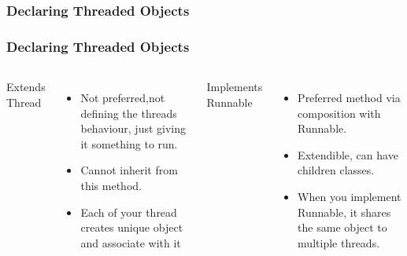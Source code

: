 \documentclass{beamer}
\begin{document}




\subsubsection{Declaring Threaded Objects}
\begin{frame}[fragile]
\frametitle{Declaring Threaded Objects}
\begin{columns}[t]

{\color{red} Extends Thread}
\lstI
\begin{itemize}
\item {\color{red}Not} preferred,not defining the threads behaviour, just giving it something to run.
\item Cannot inherit from this method.
\item Each of your thread creates unique object and associate with it
\end{itemize}

{\color{green} Implements Runnable}
\lstIV
\begin{itemize}
\item Preferred method via composition with {\color{green} Runnable}.
\item Extendible, can have children classes.
\item When you implement Runnable, it shares the same object to multiple threads.
\end{itemize}
\end{columns}
\end{frame}
\end{document}
